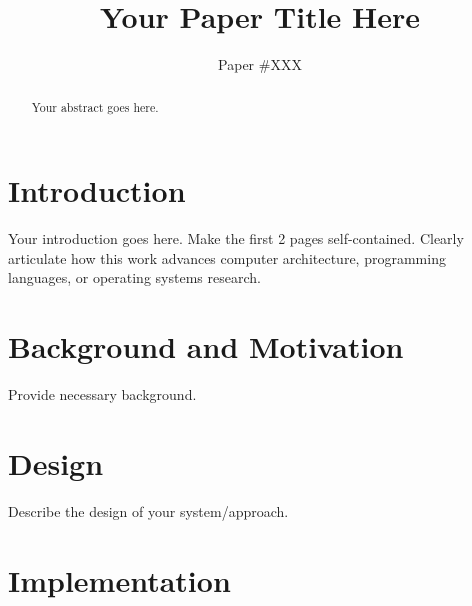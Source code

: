 \documentclass[sigplan,10pt]{acmart}
\begin{document}
\title{Your Paper Title Here}

\author{Paper \#XXX}
\affiliation{}


\begin{abstract}
Your abstract goes here.
\end{abstract}

\maketitle
\pagestyle{plain}

\section{Introduction}
\label{sec:intro}

%

Your introduction goes here. Make the first 2 pages self-contained.
Clearly articulate how this work advances computer architecture,
programming languages, or operating systems research.

\section{Background and Motivation}
\label{sec:background}

Provide necessary background.

\section{Design}
\label{sec:design}

Describe the design of your system/approach.

\section{Implementation}
\label{sec:implementation}
\end{document}
